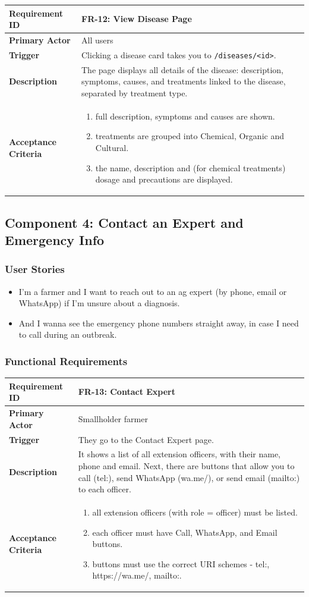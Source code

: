 \documentclass[12pt,a4paper]{article}
\newcommand{\frbox}[5]{%
  \begin{table}[H]
  \centering
  \begin{tabularx}{\textwidth}{|l|X|}
  \hline
  \rowcolor{lightgreen}
  \textbf{Requirement ID} & \textbf{#1} \\
  \hline
  \textbf{Primary Actor} & #2 \\
  \hline
  \textbf{Trigger} & #3 \\
  \hline
  \textbf{Description} & #4 \\
  \hline
  \rowcolor{lightgreen}
  \textbf{Acceptance Criteria} & #5 \\
  \hline
  \end{tabularx}
  \end{table}
}
\begin{document}
\frbox{FR-12: View Disease Page}
{All users}
{Clicking a disease card takes you to \texttt{/diseases/<id>}.}
{The page displays all details of the disease: description, symptoms, causes, and treatments linked to the disease, separated by treatment type.}
{%
\begin{enumerate}[leftmargin=1.5em, topsep=0pt]
  \item full description, symptoms and causes are shown.
  \item treatments are grouped into Chemical, Organic and Cultural.
  \item the name, description and (for chemical treatments) dosage and precautions are displayed.
\end{enumerate}
}

\subsection{Component 4: Contact an Expert and Emergency Info}

\subsubsection*{User Stories}

\begin{itemize}[leftmargin=2em]
  \item I'm a farmer and I want to reach out to an ag expert (by phone, email or WhatsApp) if I'm unsure about a diagnosis.
  \item And I wanna see the emergency phone numbers straight away, in case I need to call during an outbreak.
\end{itemize}

\subsubsection*{Functional Requirements}

\frbox{FR-13: Contact Expert}
{Smallholder farmer}
{They go to the Contact Expert page.}
{It shows a list of all extension officers, with their name, phone and email. Next, there are buttons that allow you to call (tel:), send WhatsApp (wa.me/), or send email (mailto:) to each officer.}
{%
\begin{enumerate}[leftmargin=1.5em, topsep=0pt]
  \item all extension officers (with role = officer) must be listed.
  \item each officer must have Call, WhatsApp, and Email buttons.
  \item buttons must use the correct URI schemes - tel:, https://wa.me/, mailto:.
\end{enumerate}
}
\end{document}
